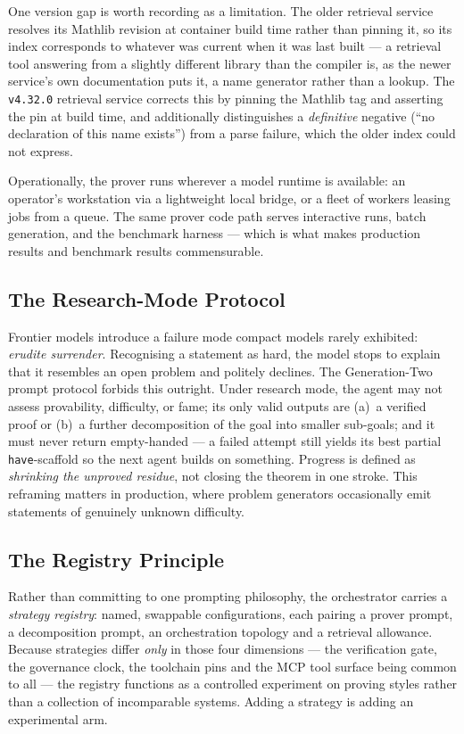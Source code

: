 \documentclass[12pt, a4paper]{article}
\begin{document}
One version gap is worth recording as a limitation. The older retrieval
service resolves its Mathlib revision at container build time rather than
pinning it, so its index corresponds to whatever was current when it was
last built --- a retrieval tool answering from a slightly different library
than the compiler is, as the newer service's own documentation puts it, a
name generator rather than a lookup. The \texttt{v4.32.0} retrieval service
corrects this by pinning the Mathlib tag and asserting the pin at build time,
and additionally distinguishes a \emph{definitive} negative (``no
declaration of this name exists'') from a parse failure, which the older
index could not express.

Operationally, the prover runs wherever a model runtime is available: an
operator's workstation via a lightweight local bridge, or a fleet of
workers leasing jobs from a queue. The same prover code path serves
interactive runs, batch generation, and the benchmark harness --- which is
what makes production results and benchmark results commensurable.

\subsection{The Research-Mode Protocol}

Frontier models introduce a failure mode compact models rarely exhibited:
\emph{erudite surrender}. Recognising a statement as hard, the model stops
to explain that it resembles an open problem and politely declines. The
Generation-Two prompt protocol forbids this outright. Under research mode,
the agent may not assess provability, difficulty, or fame; its only valid
outputs are (a)~a verified proof or (b)~a further decomposition of the goal
into smaller sub-goals; and it must never return empty-handed --- a failed
attempt still yields its best partial \texttt{have}-scaffold so the next
agent builds on something. Progress is defined as \emph{shrinking the
unproved residue}, not closing the theorem in one stroke. This reframing
matters in production, where problem generators occasionally emit statements
of genuinely unknown difficulty.

\subsection{The Registry Principle}

Rather than committing to one prompting philosophy, the orchestrator carries
a \emph{strategy registry}: named, swappable configurations, each pairing a
prover prompt, a decomposition prompt, an orchestration topology and a
retrieval allowance. Because strategies differ \emph{only} in those four
dimensions --- the verification gate, the governance clock, the toolchain
pins and the MCP tool surface being common to all --- the registry functions
as a controlled experiment on proving styles rather than a collection of
incomparable systems. Adding a strategy is adding an experimental arm.
\end{document}
